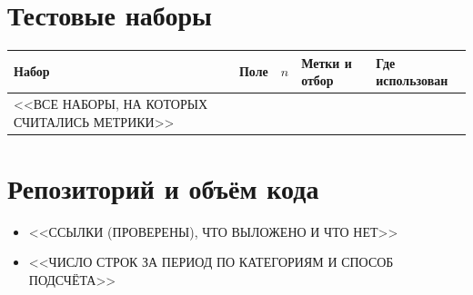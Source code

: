 \documentclass[11pt,a4paper]{article}
\begin{document}
\section{Тестовые наборы}
\begin{table}[H]
\centering\small
\begin{tabularx}{\linewidth}{>{\raggedright\arraybackslash}p{3.3cm}lr Y >{\raggedright\arraybackslash}p{3.2cm}}
\toprule
Набор & Поле & $n$ & Метки и отбор & Где использован \\
\midrule
<<ВСЕ НАБОРЫ, НА КОТОРЫХ СЧИТАЛИСЬ МЕТРИКИ>> \\
\bottomrule
\end{tabularx}
\end{table}

\section{Репозиторий и объём кода}
\begin{itemize}
  \item <<ССЫЛКИ (ПРОВЕРЕНЫ), ЧТО ВЫЛОЖЕНО И ЧТО НЕТ>>
  \item <<ЧИСЛО СТРОК ЗА ПЕРИОД ПО КАТЕГОРИЯМ И СПОСОБ ПОДСЧЁТА>>
\end{itemize}
\end{document}
